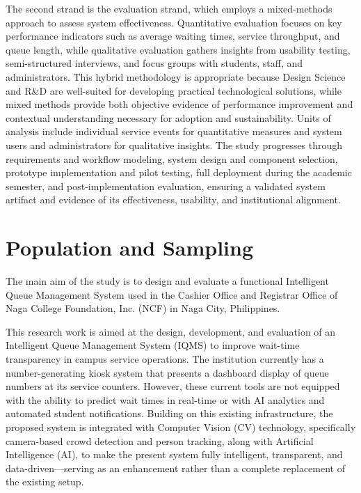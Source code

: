\documentclass{research}
\begin{document}
The second strand is the evaluation strand, which employs a mixed-methods approach to assess system effectiveness. Quantitative evaluation focuses on key performance indicators such as average waiting times, service throughput, and queue length, while qualitative evaluation gathers insights from usability testing, semi-structured interviews, and focus groups with students, staff, and administrators. This hybrid methodology is appropriate because Design Science and R\&D are well-suited for developing practical technological solutions, while mixed methods provide both objective evidence of performance improvement and contextual understanding necessary for adoption and sustainability. Units of analysis include individual service events for quantitative measures and system users and administrators for qualitative insights. The study progresses through requirements and workflow modeling, system design and component selection, prototype implementation and pilot testing, full deployment during the academic semester, and post-implementation evaluation, ensuring a validated system artifact and evidence of its effectiveness, usability, and institutional alignment.


\section{Population and Sampling}

The main aim of the study is to design and evaluate a functional Intelligent Queue Management System used in the Cashier Office and Registrar Office of Naga College Foundation, Inc. (NCF) in Naga City, Philippines.

This research work is aimed at the design, development, and evaluation of an Intelligent Queue Management System (IQMS) to improve wait-time transparency in campus service operations. The institution currently has a number-generating kiosk system that presents a dashboard display of queue numbers at its service counters. However, these current tools are not equipped with the ability to predict wait times in real-time or with AI analytics and automated student notifications. Building on this existing infrastructure, the proposed system is integrated with Computer Vision (CV) technology, specifically camera-based crowd detection and person tracking, along with Artificial Intelligence (AI), to make the present system fully intelligent, transparent, and data-driven---serving as an enhancement rather than a complete replacement of the existing setup.
\end{document}

